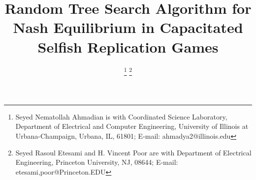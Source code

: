 \documentclass[conference, 10pt, twocolumn]{ieeeconf}
\begin{document}
\title{Random Tree Search Algorithm for Nash Equilibrium in Capacitated Selfish
Replication Games}
\author{
  \authorblockA{}
\thanks{\textdagger Seyed Nematollah Ahmadian is with
Coordinated Science Laboratory,
Department of Electrical and Computer Engineering,
University of Illinois at Urbana-Champaign, Urbana, IL, 61801;
E-mail: {ahmadya2}@illinois.edu}
\thanks{
\textdaggerdbl Seyed Rasoul Etesami and H. Vincent Poor are with
Department of Electrical Engineering,
Princeton University, NJ, 08644;
E-mail: etesami,poor@Princeton.EDU}
}
\maketitle








\end{document}
